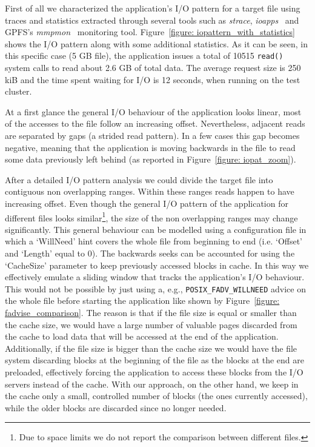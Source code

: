 First of all we characterized the application's I/O pattern for a target file using traces and statistics extracted through several tools such as \textit{strace}, \textit{ioapps}~\cite{ioapps} and GPFS's \textit{mmpmon}~\cite{mmpmon} monitoring tool. Figure~\ref{figure: iopattern_with_statistics} shows the I/O pattern along with some additional statistics. As it can be seen, in this specific case (5 GB file), the application issues a total of 10515 \texttt{read()} system calls to read about 2.6 GB of total data. The average request size is 250 kiB and the time spent waiting for I/O is 12 seconds, when running on the test cluster. 

At a first glance the general I/O behaviour of the application looks linear, most of the accesses to the file follow an increasing offset. Nevertheless, adjacent reads are separated by gaps (a strided read pattern). In a few cases this gap becomes negative, meaning that the application is moving backwards in the file to read some data previously left behind (as reported in Figure~\ref{figure: iopat_zoom}). %

After a detailed I/O pattern analysis we could divide the target file into contiguous non overlapping ranges. Within these ranges reads happen to have increasing offset. Even though the general I/O pattern of the application for different files looks similar\footnote{Due to space limits we do not report the comparison between different files.}, the size of the non overlapping ranges may change significantly. This general behaviour can be modelled using a configuration file in which a `WillNeed' hint covers the whole file from beginning to end (i.e. `Offset' and `Length' equal to 0). The backwards seeks can be accounted for using the `CacheSize' parameter to keep previously accessed blocks in cache. In this way we effectively emulate a sliding window that tracks the application's I/O behaviour. This would not be possible by just using a, e.g., \texttt{POSIX\_FADV\_WILLNEED} advice on the whole file before starting the application like shown by Figure~\ref{figure: fadvise_comparison}. The reason is that if the file size is equal or smaller than the cache size, we would have a large number of valuable pages discarded from the cache to load data that will be accessed at the end of the application. Additionally, if the file size is bigger than the cache size we would have the file system discarding blocks at the beginning of the file as the blocks at the end are preloaded, effectively forcing the application to access these blocks from the I/O servers instead of the cache. With our approach, on the other hand, we keep in the cache only a small, controlled number of blocks (the ones currently accessed), while the older blocks are discarded since no longer needed. 

